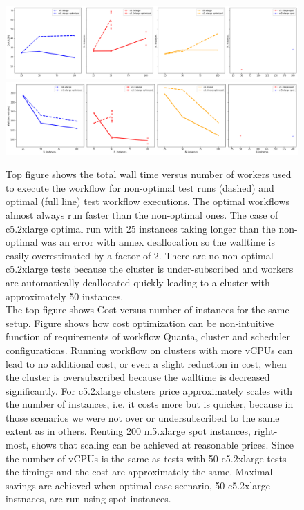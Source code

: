 \documentclass[a4paper, 10pt, conference]{ieeeconf}
\begin{document}
\begin{figure}[htb]
\centering
\includegraphics[width=\columnwidth]{figures/Cost.png}
\includegraphics[width=\columnwidth]{figures/WallTime.png}
\caption{Top figure shows the total wall time versus number of workers used to execute the workflow for non-optimal test runs (dashed) and optimal (full line) test workflow executions. The optimal workflows almost always run faster than the non-optimal ones. The case of c5.2xlarge optimal run with 25 instances taking longer than the non-optimal was an error with annex deallocation so the walltime is easily overestimated by a factor of 2. There are no non-optimal c5.2xlarge tests because the cluster is under-subscribed and workers are automatically deallocated quickly leading to a cluster with approximately 50 instances. \\
The top figure shows Cost versus number of instances for the same setup. Figure shows how cost optimization can be non-intuitive function of requirements of workflow Quanta, cluster and scheduler configurations. Running workflow on clusters with more vCPUs can lead to  no additional cost, or even a slight reduction in cost, when the cluster is oversubscribed because the walltime is decreased significantly. For c5.2xlarge clusters price approximately scales with the number of instances, i.e. it costs more but is quicker, because in those scenarios we were not over or undersubscribed to the same extent as in others. Renting 200 m5.xlarge spot instances, right-most, shows that scaling can be achieved at reasonable prices. Since the number of vCPUs is the same as tests with 50 c5.2xlarge tests the timings and the cost are approximately the same. Maximal savings are achieved when optimal case scenario, 50 c5.2xlarge instnaces, are run using spot instances.}
\label{fig:demo-workflow}
\end{figure}
\end{document}
